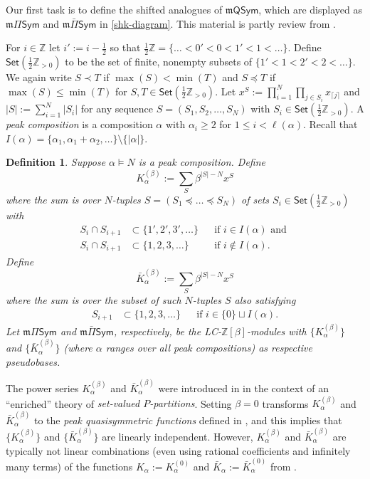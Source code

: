 \documentclass[11pt]{article}
\newtheorem{definition}[theo]{Definition}
\theoremstyle{definition}
\numberwithin{equation}{section}
\numberwithin{equation}{section}
\newcommand{\ZZ}{\mathbb{Z}}
\newcommand{\ba}{\begin{aligned}}
\newcommand{\ea}{\end{aligned}}
\newcommand{\be}{\begin{equation}}
\newcommand{\ee}{\end{equation}}
\newcommand{\bK}{\bar{K}}
\newcommand{\Sym}{\mathsf{Sym}}
\newcommand{\QSymQ}{\Pi\Sym}
\newcommand{\QSymP}{\bar{\Pi}\Sym}
\newcommand{\mQSymQ}{\mathfrak{m}\QSymQ}
\newcommand{\mQSymP}{\mathfrak{m}\QSymP}
\newcommand{\MSet}{\mathsf{Set}(\MM)}
\newcommand{\mQSym}{\mathfrak{m}\mathsf{QSym}}
\newcommand{\PP}{\ZZ_{>0}}
\newcommand{\MM}{\frac{1}{2}\PP}
\newcommand{\defn}[1]{{\color{darkred}\emph{#1}}}
\begin{document}
Our first task is to define the shifted analogues of $\mQSym$, which are displayed as
$\mQSymQ$ and $\mQSymP$ in \eqref{shk-diagram}.
This material is partly review from \cite{LM2019}.

For $i \in \ZZ$ let $i' := i - \frac{1}{2}$ so that $\frac{1}{2} \ZZ = \{ \dots < 0' < 0 < 1' < 1 < \dots\}$.
Define $\MSet$ to be the set of finite, nonempty subsets of $\{1'<1<2'<2< \dots\}.$
We again write $S\prec T$ if $\max(S) < \min(T)$ and $S \preceq T$ if $\max(S) \leq \min(T)$
for $S,T \in \MSet$. 
Let 
$x^S := \prod_{i=1}^N \prod_{j \in S_i} x_{\lceil j\rceil }$ and $ |S| := \sum_{i=1}^N |S_i|$
for any sequence $S=(S_1,S_2,\dots,S_N)$ with $S_i \in \MSet$.
A \defn{peak composition} is a composition $\alpha$ 
with $\alpha_i \geq 2$ for $1\leq i < \ell(\alpha)$.
Recall that $I(\alpha) = \{\alpha_1, \alpha_1+\alpha_2, \dots\} \setminus \{|\alpha|\}$. 

\begin{definition}\label{peak-def}
Suppose $\alpha \vDash N$ is a peak composition. Define
\[
K^{(\beta)}_\alpha   := \sum_{
S
}
\beta^{|S|-N} x^S
\]
where the sum is
 over $N$-tuples $S=(S_1 \preceq \dots\preceq S_N)$ of sets $S_i \in \MSet$
with
\be\label{peak-def-eq1}
\ba S_i \cap S_{i+1} &\subset \{1',2',3',\dots\}&&\text{if $i \in I(\alpha)$} \text{ and }
\\
S_i \cap S_{i+1} &\subset \{1,2,3,\dots\}&&\text{if $i \notin I(\alpha)$.}
\ea
\ee
Define \[\bK^{(\beta)}_\alpha   := \sum_{
S
}
\beta^{|S|-N} x^S\] where the sum is over the subset of such $N$-tuples $S$
also satisfying
\be\label{peak-def-eq2}
\ba S_{i+1} &\subset \{1,2,3,\dots\}&&\text{if $i \in \{0\} \sqcup I(\alpha)$.}\ea
\ee
Let $\mQSymQ $ and $\mQSymP$, respectively,
be the  LC-$\ZZ[\beta]$-modules
with  $\{ K^{(\beta)}_\alpha\}$ and $\{ \bK^{(\beta)}_\alpha\}$ (where
$\alpha$ ranges over all peak compositions)
as respective pseudobases.
\end{definition}


The power series $K^{(\beta)}_\alpha$ and $\bK^{(\beta)}_\alpha$ were introduced in \cite{LM2019}
in the context of an ``enriched'' theory of \defn{set-valued $P$-partitions}.
Setting $\beta=0$ transforms $K^{(\beta)}_\alpha$ and $\bK^{(\beta)}_\alpha$ to 
the \defn{peak quasisymmetric functions} defined in \cite[\S3]{Stembridge1997a},
and this implies that   $\{ K^{(\beta)}_\alpha\}$ and $\{ \bK^{(\beta)}_\alpha\}$ are linearly independent.
 However, $K^{(\beta)}_\alpha$ and $\bK^{(\beta)}_\alpha$ are typically not linear combinations 
 (even using rational coefficients and infinitely many terms) of
 the functions $K_\alpha := K^{(0)}_\alpha$
 and 
 $\bK_\alpha := \bK^{(0)}_\alpha$ from \cite[\S3]{Stembridge1997a}.
\end{document}
